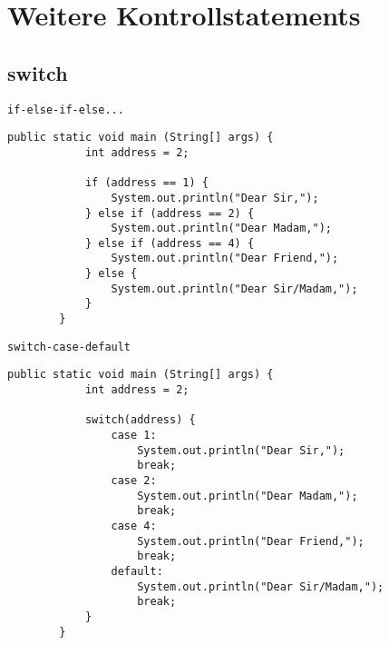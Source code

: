 \section{Weitere Kontrollstatements}
\subsection{switch}
\begin{frame}[fragile]{\texttt{if-else-if-else...}}
	\begin{lstlisting}[gobble=8]
        public static void main (String[] args) {
            int address = 2;
                
            if (address == 1) {
                System.out.println("Dear Sir,");	    
            } else if (address == 2) {
                System.out.println("Dear Madam,");		    
            } else if (address == 4) {
                System.out.println("Dear Friend,");		    
            } else {
                System.out.println("Dear Sir/Madam,");	
            }
        }
	\end{lstlisting}
\end{frame}

\begin{frame}[fragile]{\texttt{switch-case-default}}
	\begin{lstlisting}[gobble=8]
        public static void main (String[] args) {
            int address = 2;
            
            switch(address) {
                case 1:
                    System.out.println("Dear Sir,");
                    break;
                case 2:
                    System.out.println("Dear Madam,");
                    break;
                case 4:
                    System.out.println("Dear Friend,");
                    break; 
                default:
                    System.out.println("Dear Sir/Madam,");
                    break;
            }
        }
	\end{lstlisting}
\end{frame}

